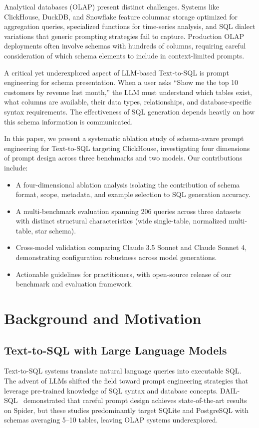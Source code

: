 \documentclass[sigconf, nonacm]{acmart}
\begin{document}
Analytical databases (OLAP) present distinct challenges. Systems like ClickHouse, DuckDB, and Snowflake feature columnar storage optimized for aggregation queries, specialized functions for time-series analysis, and SQL dialect variations that generic prompting strategies fail to capture. Production OLAP deployments often involve schemas with hundreds of columns, requiring careful consideration of which schema elements to include in context-limited prompts.

A critical yet underexplored aspect of LLM-based Text-to-SQL is prompt engineering for schema presentation. When a user asks ``Show me the top 10 customers by revenue last month,'' the LLM must understand which tables exist, what columns are available, their data types, relationships, and database-specific syntax requirements. The effectiveness of SQL generation depends heavily on how this schema information is communicated.

In this paper, we present a systematic ablation study of schema-aware prompt engineering for Text-to-SQL targeting ClickHouse, investigating four dimensions of prompt design across three benchmarks and two models. Our contributions include:
\begin{itemize}
    \item A four-dimensional ablation analysis isolating the contribution of schema format, scope, metadata, and example selection to SQL generation accuracy.
    \item A multi-benchmark evaluation spanning 206 queries across three datasets with distinct structural characteristics (wide single-table, normalized multi-table, star schema).
    \item Cross-model validation comparing Claude 3.5 Sonnet and Claude Sonnet 4, demonstrating configuration robustness across model generations.
    \item Actionable guidelines for practitioners, with open-source release of our benchmark and evaluation framework.
\end{itemize}

\section{Background and Motivation}
\label{sec:background}

\subsection{Text-to-SQL with Large Language Models}
Text-to-SQL systems translate natural language queries into executable SQL. The advent of LLMs shifted the field toward prompt engineering strategies that leverage pre-trained knowledge of SQL syntax and database concepts. DAIL-SQL~\cite{gao2024dailsql} demonstrated that careful prompt design achieves state-of-the-art results on Spider, but these studies predominantly target SQLite and PostgreSQL with schemas averaging 5--10 tables, leaving OLAP systems underexplored.
\end{document}
